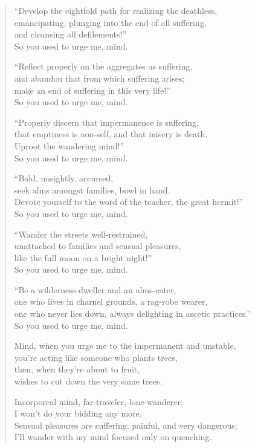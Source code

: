 \documentclass[12pt,openany]{book}%
\begin{document}
\begin{verse}
“Develop the eightfold path for realizing the deathless, \\
emancipating, plunging into the end of all suffering, \\
and cleansing all defilements!” \\
So you used to urge me, mind. 

“Reflect properly on the aggregates as suffering, \\
and abandon that from which suffering arises; \\
make an end of suffering in this very life!” \\
So you used to urge me, mind. 

“Properly discern that impermanence is suffering, \\
that emptiness is non-self, and that misery is death. \\
Uproot the wandering mind!” \\
So you used to urge me, mind. 

“Bald, unsightly, accursed, \\
seek alms amongst families, bowl in hand. \\
Devote yourself to the word of the teacher, the great hermit!” \\
So you used to urge me, mind. 

“Wander the streets well-restrained, \\
unattached to families and sensual pleasures, \\
like the full moon on a bright night!” \\
So you used to urge me, mind. 

“Be a wilderness-dweller and an alms-eater, \\
one who lives in charnel grounds, a rag-robe wearer, \\
one who never lies down, always delighting in ascetic practices.” \\
So you used to urge me, mind. 

Mind, when you urge me to the impermanent and unstable, \\
you’re acting like someone who plants trees, \\
then, when they’re about to fruit, \\
wishes to cut down the very same trees. 

Incorporeal mind, far-traveler, lone-wanderer: \\
I won’t do your bidding any more. \\
Sensual pleasures are suffering, painful, and very dangerous; \\
I’ll wander with my mind focused only on quenching. 


\end{verse}
\end{document}
